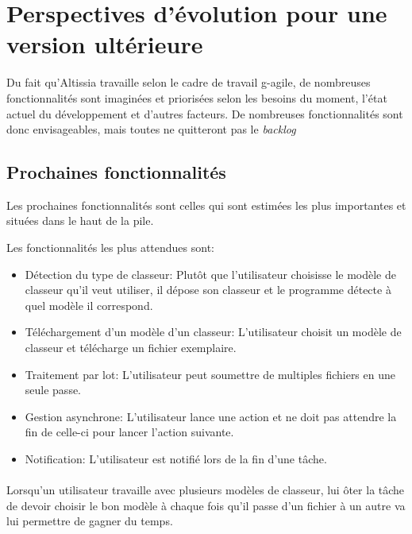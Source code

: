 \section{Perspectives d'évolution pour une version ultérieure}
\label{sec:future-release-outlook}

Du fait qu’Altissia travaille selon le cadre de travail \Gls{g-agile}, de nombreuses fonctionnalités sont imaginées et priorisées selon les besoins du moment, l'état actuel du développement et d'autres facteurs.
De nombreuses fonctionnalités sont donc envisageables, mais toutes ne quitteront pas le \textit{backlog}\fnmark
{}

\subsection{Prochaines fonctionnalités}
\label{subsec:next-features}

Les prochaines fonctionnalités sont celles qui sont estimées les plus importantes et situées dans le haut de la pile.

Les fonctionnalités les plus attendues sont:
\begin{itemize}
    \item Détection du type de classeur: Plutôt que l'utilisateur choisisse le modèle de classeur qu'il veut utiliser, il dépose son classeur et le programme détecte à quel modèle il correspond.
    \item Téléchargement d'un modèle d'un classeur: L'utilisateur choisit un modèle de classeur et télécharge un fichier exemplaire.
    \item Traitement par lot: L'utilisateur peut soumettre de multiples fichiers en une seule passe.
    \item Gestion asynchrone: L'utilisateur lance une action et ne doit pas attendre la fin de celle-ci pour lancer l'action suivante.
    \item Notification: L'utilisateur est notifié lors de la fin d'une tâche.
\end{itemize}

\paragraph{}
Lorsqu'un utilisateur travaille avec plusieurs modèles de classeur, lui ôter la tâche de devoir choisir le bon modèle à chaque fois qu'il passe d'un fichier à un autre va lui permettre de gagner du temps.

